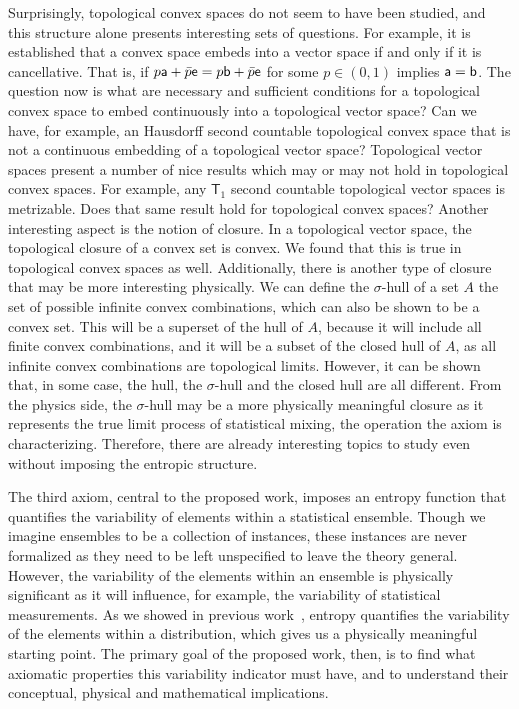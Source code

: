Surprisingly, topological convex spaces do not seem to have been studied, and this structure alone presents interesting sets of questions.  For example, it is established that a convex space embeds into a vector space if and only if it is cancellative. That is, if $p \ens[a] + \bar{p} \ens = p \ens[b] + \bar{p} \ens$ for some $p \in (0,1)$ implies $\ens[a] = \ens[b]$. The question now is what are necessary and sufficient conditions for a topological convex space to embed continuously into a topological vector space? Can we have, for example, an Hausdorff second countable topological convex space that is not a continuous embedding of a topological vector space? Topological vector spaces present a number of nice results which may or may not hold in topological convex spaces. For example, any $\mathsf{T}_1$ second countable topological vector spaces is metrizable. Does that same result hold for topological convex spaces? Another interesting aspect is the notion of closure. In a topological vector space, the topological closure of a convex set is convex. We found that this is true in topological convex spaces as well. Additionally, there is another type of closure that may be more interesting physically. We can define the $\sigma$-hull of a set $A$ the set of possible infinite convex combinations, which can also be shown to be a convex set. This will be a superset of the hull of $A$, because it will include all finite convex combinations, and it will be a subset of the closed hull of $A$, as all infinite convex combinations are topological limits. However, it can be shown that, in some case, the hull, the $\sigma$-hull and the closed hull are all different. From the physics side, the $\sigma$-hull may be a more physically meaningful closure as it represents the true limit process of statistical mixing, the operation the axiom is characterizing. Therefore, there are already interesting topics to study even without imposing the entropic structure.

The third axiom, central to the proposed work, imposes an entropy function that quantifies the variability of elements within a statistical ensemble. Though we imagine ensembles to be a collection of instances, these instances are never formalized as they need to be left unspecified to leave the theory general. However, the variability of the elements within an ensemble is physically significant as it will influence, for example, the variability of statistical measurements. As we showed in previous work~\cite{Carcassi:2021}, entropy quantifies the variability of the elements within a distribution, which gives us a physically meaningful starting point. The primary goal of the proposed work, then, is to find what axiomatic properties this variability indicator must have, and to understand their conceptual, physical and mathematical implications.

